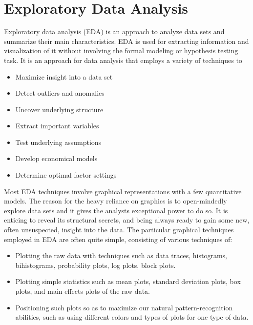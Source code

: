 \section{Exploratory Data Analysis}
\vspace{-0.1in}

Exploratory data analysis (EDA) is an approach to analyze data sets and summarize their main characteristics. EDA is used for extracting information and visualization of it without involving the formal modeling or hypothesis testing task. It is an approach for data analysis that employs a variety of techniques to
\begin{itemize}
\item Maximize insight into a data set
\item Detect outliers and anomalies
\item Uncover underlying structure
\item Extract important variables
\item Test underlying assumptions
\item Develop economical models
\item Determine optimal factor settings
\end{itemize}

Most EDA techniques involve graphical representations with a few quantitative models. The reason for the heavy reliance on graphics is to open-mindedly explore data sets and it gives the analysts exceptional power to do so. It is enticing to reveal its structural secrets, and being always ready to gain some new, often unsuspected, insight into the data.
The particular graphical techniques employed in EDA are often quite simple, consisting of various techniques of:

\begin{itemize}
\item Plotting the raw data with techniques such as data traces, histograms, bihistograms, probability plots, log plots, block plots.
\item Plotting simple statistics such as mean plots, standard deviation plots, box plots, and main effects plots of the raw data.
\item Positioning such plots so as to maximize our natural pattern-recognition abilities, such as using different colors and types of plots for one type of data.
\end{itemize}


